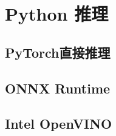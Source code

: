 \chapter{Python 推理}
\label{chapter:7}

\section{PyTorch直接推理}

\section{ONNX Runtime}

\section{Intel OpenVINO}
